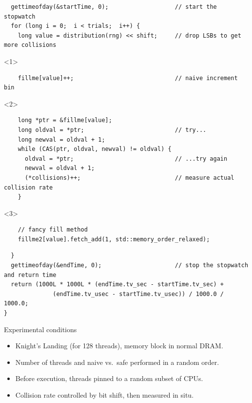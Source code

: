 \documentclass{beamer}
\begin{document}
\begin{frame}[fragile]{}
\begin{verbatim}
  gettimeofday(&startTime, 0);                   // start the stopwatch
  for (long i = 0;  i < trials;  i++) {
    long value = distribution(rng) << shift;     // drop LSBs to get more collisions
\end{verbatim}
\begin{onlyenv}<1>
\begin{verbatim}
    fillme[value]++;                             // naive increment bin
\end{verbatim}
\end{onlyenv}
\begin{onlyenv}<2>
\begin{verbatim}
    long *ptr = &fillme[value];
    long oldval = *ptr;                          // try...
    long newval = oldval + 1;
    while (CAS(ptr, oldval, newval) != oldval) {
      oldval = *ptr;                             // ...try again
      newval = oldval + 1;
      (*collisions)++;                           // measure actual collision rate
    }
\end{verbatim}
\end{onlyenv}
\begin{onlyenv}<3>
\begin{verbatim}
    // fancy fill method
    fillme2[value].fetch_add(1, std::memory_order_relaxed);
\end{verbatim}
\end{onlyenv}
\begin{verbatim}
  }
  gettimeofday(&endTime, 0);                     // stop the stopwatch and return time
  return (1000L * 1000L * (endTime.tv_sec - startTime.tv_sec) +
              (endTime.tv_usec - startTime.tv_usec)) / 1000.0 / 1000.0;
}
\end{verbatim}
\end{frame}

\begin{frame}{Experimental conditions}
\Large
\begin{itemize}\setlength{\itemsep}{0.5 cm}
\item Knight's Landing (for 128 threads), memory block in normal DRAM.
\item Number of threads and naive vs.\ safe performed in a random order.
\item Before execution, threads pinned to a random subset of CPUs.
\item Collision rate controlled by bit shift, then measured in situ.
\end{itemize}
\end{frame}
\end{document}
